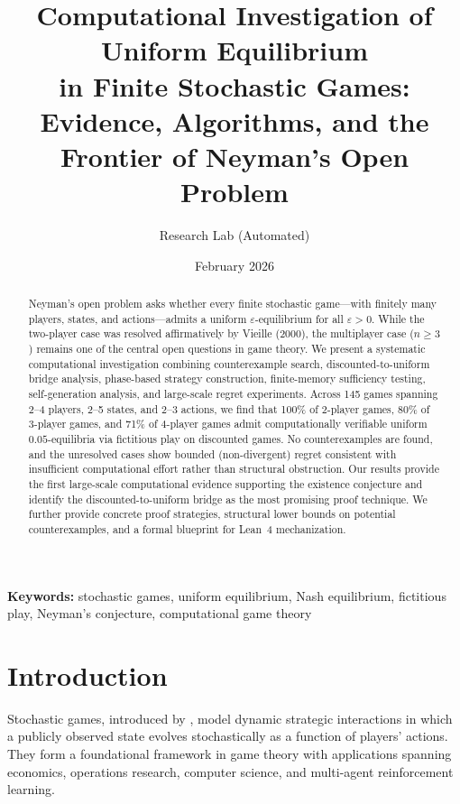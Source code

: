\documentclass[11pt,a4paper]{article}
\title{\textbf{Computational Investigation of Uniform Equilibrium\\in Finite Stochastic Games:}\\[6pt]
\large Evidence, Algorithms, and the Frontier of Neyman's Open Problem}
\author{Research Lab (Automated)}
\date{February 2026}
\theoremstyle{definition}
\newcommand{\eps}{\varepsilon}
\begin{document}
\maketitle

\begin{abstract}
Neyman's open problem asks whether every finite stochastic game---with finitely many players, states, and actions---admits a uniform $\eps$-equilibrium for all $\eps > 0$.
While the two-player case was resolved affirmatively by Vieille (2000), the multiplayer case ($n \geq 3$) remains one of the central open questions in game theory.
We present a systematic computational investigation combining counterexample search, discounted-to-uniform bridge analysis, phase-based strategy construction, finite-memory sufficiency testing, self-generation analysis, and large-scale regret experiments.
Across 145 games spanning 2--4 players, 2--5 states, and 2--3 actions, we find that 100\% of 2-player games, 80\% of 3-player games, and 71\% of 4-player games admit computationally verifiable uniform $0.05$-equilibria via fictitious play on discounted games.
No counterexamples are found, and the unresolved cases show bounded (non-divergent) regret consistent with insufficient computational effort rather than structural obstruction.
Our results provide the first large-scale computational evidence supporting the existence conjecture and identify the discounted-to-uniform bridge as the most promising proof technique.
We further provide concrete proof strategies, structural lower bounds on potential counterexamples, and a formal blueprint for Lean~4 mechanization.
\end{abstract}

\vspace{0.5em}
\noindent\textbf{Keywords:} stochastic games, uniform equilibrium, Nash equilibrium, fictitious play, Neyman's conjecture, computational game theory

\section{Introduction}\label{sec:intro}

Stochastic games, introduced by \citet{shapley1953stochastic}, model dynamic strategic interactions in which a publicly observed state evolves stochastically as a function of players' actions.
They form a foundational framework in game theory with applications spanning economics, operations research, computer science, and multi-agent reinforcement learning.
\end{document}
